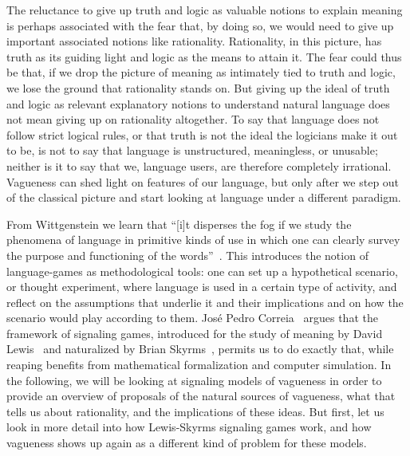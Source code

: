 \documentclass[a4paper]{article}
\begin{document}
The reluctance to give up truth and logic as valuable notions to explain meaning is perhaps associated with the fear that, by doing so, we would need to give up important associated notions like rationality.
Rationality, in this picture, has truth as its guiding light and logic as the means to attain it.
The fear could thus be that, if we drop the picture of meaning as intimately tied to truth and logic, we lose the ground that rationality stands on.
But giving up the ideal of truth and logic as relevant explanatory notions to understand natural language does not mean giving up on rationality altogether.
To say that language does not follow strict logical rules, or that truth is not the ideal the logicians make it out to be, is not to say that language is unstructured, meaningless, or unusable; neither is it to say that we, language users, are therefore completely irrational.
Vagueness can shed light on features of our language, but only after we step out of the classical picture and start looking at language under a different paradigm.

From Wittgenstein we learn that ``[i]t disperses the fog if we study the phenomena of language in primitive kinds of use in which one can clearly survey the purpose and functioning of the words''~\parencite*[\S 5]{wittgenstein_philosophical_1953}.
This introduces the notion of language-games as methodological tools: one can set up a hypothetical scenario, or thought experiment, where language is used in a certain type of activity, and reflect on the assumptions that underlie it and their implications and on how the scenario would play according to them.
Jos\'e Pedro Correia~\parencite*{correia_bivalent_2013} argues that the framework of signaling games, introduced for the study of meaning by David Lewis~\parencite*{lewis_convention_1969} and naturalized by Brian Skyrms~\parencite*{skyrms_evolution_1996,skyrms_signals_2010}, permits us to do exactly that, while reaping benefits from mathematical formalization and computer simulation.
In the following, we will be looking at signaling models of vagueness in order to provide an overview of proposals of the natural sources of vagueness, what that tells us about rationality, and the implications of these ideas.
But first, let us look in more detail into how Lewis-Skyrms signaling games work, and how vagueness shows up again as a different kind of problem for these models.
\end{document}

